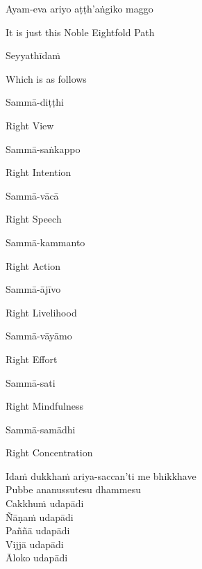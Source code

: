 Ayam-eva ariyo aṭṭh'aṅgiko maggo

\begin{english}
  It is just this Noble Eightfold Path
\end{english}

Seyyathīdaṁ

\begin{english}
  Which is as follows
\end{english}

Sammā-diṭṭhi

\begin{english}
  Right View
\end{english}

Sammā-saṅkappo

\begin{english}
  Right Intention
\end{english}

Sammā-vācā

\begin{english}
  Right Speech
\end{english}

Sammā-kammanto

\begin{english}
  Right Action
\end{english}

Sammā-ājīvo

\begin{english}
  Right Livelihood
\end{english}

Sammā-vāyāmo

\begin{english}
  Right Effort
\end{english}

Sammā-sati

\begin{english}
  Right Mindfulness
\end{english}

Sammā-samādhi

\begin{english}
  Right Concentration
\end{english}

Idaṁ dukkhaṁ ariya-saccan'ti me bhikkhave\\
Pubbe ananussutesu dhammesu\\
Cakkhuṁ udapādi\\
Ñāṇaṁ udapādi\\
Paññā udapādi\\
Vijjā udapādi\\
Āloko udapādi

